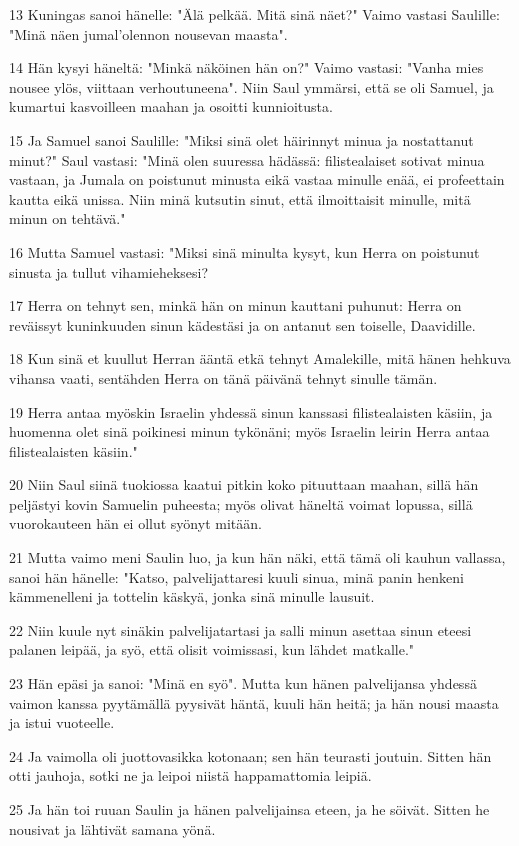 \par 13 Kuningas sanoi hänelle: "Älä pelkää. Mitä sinä näet?" Vaimo vastasi Saulille: "Minä näen jumal'olennon nousevan maasta".
\par 14 Hän kysyi häneltä: "Minkä näköinen hän on?" Vaimo vastasi: "Vanha mies nousee ylös, viittaan verhoutuneena". Niin Saul ymmärsi, että se oli Samuel, ja kumartui kasvoilleen maahan ja osoitti kunnioitusta.
\par 15 Ja Samuel sanoi Saulille: "Miksi sinä olet häirinnyt minua ja nostattanut minut?" Saul vastasi: "Minä olen suuressa hädässä: filistealaiset sotivat minua vastaan, ja Jumala on poistunut minusta eikä vastaa minulle enää, ei profeettain kautta eikä unissa. Niin minä kutsutin sinut, että ilmoittaisit minulle, mitä minun on tehtävä."
\par 16 Mutta Samuel vastasi: "Miksi sinä minulta kysyt, kun Herra on poistunut sinusta ja tullut vihamieheksesi?
\par 17 Herra on tehnyt sen, minkä hän on minun kauttani puhunut: Herra on reväissyt kuninkuuden sinun kädestäsi ja on antanut sen toiselle, Daavidille.
\par 18 Kun sinä et kuullut Herran ääntä etkä tehnyt Amalekille, mitä hänen hehkuva vihansa vaati, sentähden Herra on tänä päivänä tehnyt sinulle tämän.
\par 19 Herra antaa myöskin Israelin yhdessä sinun kanssasi filistealaisten käsiin, ja huomenna olet sinä poikinesi minun tykönäni; myös Israelin leirin Herra antaa filistealaisten käsiin."
\par 20 Niin Saul siinä tuokiossa kaatui pitkin koko pituuttaan maahan, sillä hän peljästyi kovin Samuelin puheesta; myös olivat häneltä voimat lopussa, sillä vuorokauteen hän ei ollut syönyt mitään.
\par 21 Mutta vaimo meni Saulin luo, ja kun hän näki, että tämä oli kauhun vallassa, sanoi hän hänelle: "Katso, palvelijattaresi kuuli sinua, minä panin henkeni kämmenelleni ja tottelin käskyä, jonka sinä minulle lausuit.
\par 22 Niin kuule nyt sinäkin palvelijatartasi ja salli minun asettaa sinun eteesi palanen leipää, ja syö, että olisit voimissasi, kun lähdet matkalle."
\par 23 Hän epäsi ja sanoi: "Minä en syö". Mutta kun hänen palvelijansa yhdessä vaimon kanssa pyytämällä pyysivät häntä, kuuli hän heitä; ja hän nousi maasta ja istui vuoteelle.
\par 24 Ja vaimolla oli juottovasikka kotonaan; sen hän teurasti joutuin. Sitten hän otti jauhoja, sotki ne ja leipoi niistä happamattomia leipiä.
\par 25 Ja hän toi ruuan Saulin ja hänen palvelijainsa eteen, ja he söivät. Sitten he nousivat ja lähtivät samana yönä.

